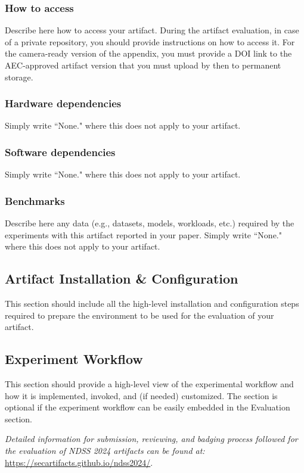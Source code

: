 \documentclass[conference]{IEEEtran}
\begin{document}
\subsubsection{How to access}
Describe here how to access your artifact. During the artifact evaluation, in case of a private repository, you should provide instructions on how to access it. For the camera-ready version of the appendix, you must provide a DOI link to the AEC-approved artifact version that you must upload by then to permanent storage.

\subsubsection{Hardware dependencies}
Simply write ``None." where this does not apply to your artifact.

\subsubsection{Software dependencies} 
Simply write ``None." where this does not apply to your artifact.

\subsubsection{Benchmarks} 
Describe here any data (e.g., datasets, models, workloads, etc.) required by the experiments with this artifact reported in your paper. Simply write ``None." where this does not apply to your artifact.


\subsection{Artifact Installation \& Configuration}

This section should include all the high-level installation and configuration steps required to prepare the environment to be used for the evaluation of your artifact.

\subsection{Experiment Workflow}

This section should provide a high-level view of the experimental workflow and how it is implemented, invoked, and (if needed) customized. The section is optional if the experiment workflow can be easily embedded in the Evaluation section.

\textit{Detailed information for submission, reviewing, and badging process followed for the evaluation of NDSS 2024 artifacts can be found at:} \url{https://secartifacts.github.io/ndss2024/}.
\end{document}
